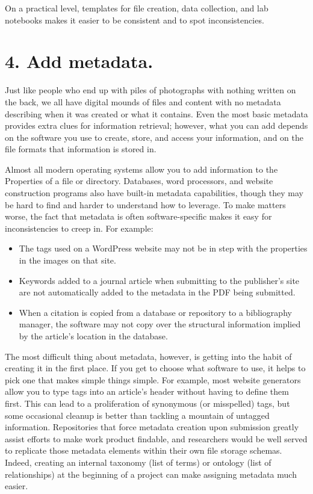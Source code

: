 \documentclass[10pt,letterpaper]{article}
\newcommand{\rulemajor}[1]{\section*{#1}}
\begin{document}
On a practical level, templates for file creation, data collection, and lab
notebooks makes it easier to be consistent and to spot inconsistencies.

\rulemajor{4. Add metadata.}

Just like people who end up with piles of photographs with nothing written on
the back, we all have digital mounds of files and content with no metadata
describing when it was created or what it contains. Even the most basic metadata
provides extra clues for information retrieval; however, what you can add
depends on the software you use to create, store, and access your information,
and on the file formats that information is stored in.

Almost all modern operating systems allow you to add information to the
Properties of a file or directory. Databases, word processors, and website
construction programs also have built-in metadata capabilities, though they may
be hard to find and harder to understand how to leverage. To make matters worse,
the fact that metadata is often software-specific makes it easy for
inconsistencies to creep in. For example:

\begin{itemize}

\item
  The tags used on a WordPress website may not be in step with the properties in
  the images on that site.

\item
  Keywords added to a journal article when submitting to the publisher's site
  are not automatically added to the metadata in the PDF being submitted.

\item
  When a citation is copied from a database or repository to a bibliography manager,
  the software may not copy over the structural information implied by the
  article's location in the database.

\end{itemize}

The most difficult thing about metadata, however, is getting into the habit of
creating it in the first place. If you get to choose what software to use, it
helps to pick one that makes simple things simple. For example, most website
generators allow you to type tags into an article's header without having to
define them first. This can lead to a proliferation of synonymous (or
misspelled) tags, but some occasional cleanup is better than tackling a mountain
of untagged information. Repositories that force metadata creation upon submission 
greatly assist efforts to make work product findable, and researchers would be 
well served to replicate those metadata elements within their own file storage 
schemas. Indeed, creating an internal taxonomy (list of terms) or ontology (list of
relationships) at the beginning of a project can make assigning metadata much easier.
\end{document}
